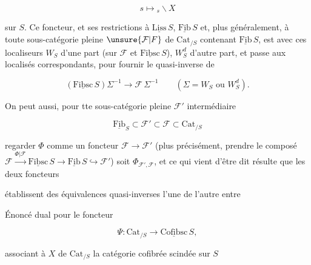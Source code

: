 \[
s\longmapsto {}_s\backslash X
\]

sur $S$. Ce foncteur, et ses restrictions à $\underline{\mathrm{Liss}}\,S$, $\underline{\mathrm{Fib}}\,S$ et, plus généralement, à toute sous-catégorie pleine $\unsure{\mathcal{F}|F}$ de $\mathrm{Cat}_{/S}$ contenant $\underline{\mathrm{Fib}}\,S$,  est  avec ces localiseurs $W_S$ d'une part (sur $\mathcal{F}$ et $\underline{\mathrm{Fibsc}}\,S$), $W_S^d$ d'autre part, et passe  aux localisés correspondants, pour fournir le quasi-inverse  de

\[
(\underline{\mathrm{Fibsc}}\,S)\Sigma^{-1}\longrightarrow\mathcal{F}\,\Sigma^{-1}
\qquad(\Sigma=W_S\text{ ou }W_S^d).
\]

On peut aussi, pour tte sous-catégorie pleine $\mathcal{F}'$ intermédiaire

\[
\underline{\mathrm{Fib}}_S\subset\mathcal{F}'\subset\mathcal{F}\subset\mathrm{Cat}_{/S}
\]

regarder $\Phi$ comme un foncteur $\mathcal{F}\longrightarrow\mathcal{F}'$ (plus précisément, prendre le composé $\mathcal{F}\xrightarrow{\Phi|\mathcal{F}}\underline{\mathrm{Fibsc}}\,S\longrightarrow\underline{\mathrm{Fib}}\,S\hookrightarrow\mathcal{F}'$) soit $\Phi_{\mathcal{F}',\mathcal{F}}$, et  ce qui vient d'être dit résulte que les deux foncteurs


établissent des équivalences quasi-inverses l'une de l'autre entre


Énoncé dual pour le foncteur

\[
\Psi:\mathrm{Cat}_{/S}\longrightarrow\underline{\mathrm{Cofibsc}}\,S,
\]

associant à $X$ de $\mathrm{Cat}_{/S}$ la catégorie cofibrée scindée sur $S$

